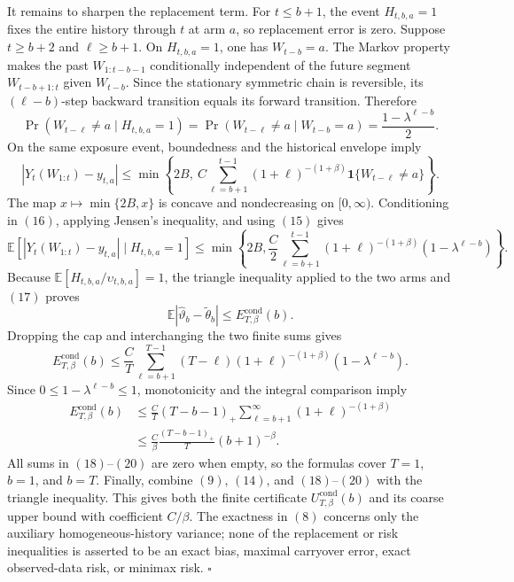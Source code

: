 It remains to sharpen the replacement term. For \(t\le b+1\), the event \(H_{t,b,a}=1\) fixes the entire history through \(t\) at arm \(a\), so replacement error is zero. Suppose \(t\ge b+2\) and \(\ell\ge b+1\). On \(H_{t,b,a}=1\), one has \(W_{t-b}=a\). The Markov property makes the past \(W_{1:t-b-1}\) conditionally independent of the future segment \(W_{t-b+1:t}\) given \(W_{t-b}\). Since the stationary symmetric chain is reversible, its \((\ell-b)\)-step backward transition equals its forward transition. Therefore
\[
\Pr(W_{t-\ell}\ne a\mid H_{t,b,a}=1)
=\Pr(W_{t-\ell}\ne a\mid W_{t-b}=a)
=\frac{1-\lambda^{\ell-b}}2.
\tag{15}
\]
On the same exposure event, boundedness and the historical envelope imply
\[
|Y_t(W_{1:t})-y_{t,a}|
\le \min\!\left\{2B,\ C\sum_{\ell=b+1}^{t-1}(1+\ell)^{-(1+\beta)}\mathbf1\{W_{t-\ell}\ne a\}\right\}.
\tag{16}
\]
The map \(x\mapsto\min\{2B,x\}\) is concave and nondecreasing on \([0,\infty)\). Conditioning in \((16)\), applying Jensen's inequality, and using \((15)\) gives
\[
\mathbb E\!\left[|Y_t(W_{1:t})-y_{t,a}|\mid H_{t,b,a}=1\right]
\le\min\!\left\{2B,\frac C2\sum_{\ell=b+1}^{t-1}(1+\ell)^{-(1+\beta)}(1-\lambda^{\ell-b})\right\}.
\tag{17}
\]
Because \(\mathbb E[H_{t,b,a}/\upsilon_{t,b,a}]=1\), the triangle inequality applied to the two arms and \((17)\) proves
\[
\mathbb E|\widehat\vartheta_b-\widetilde\theta_b|\le E_{T,\beta}^{\mathrm{cond}}(b).
\tag{18}
\]
Dropping the cap and interchanging the two finite sums gives
\[
E_{T,\beta}^{\mathrm{cond}}(b)
\le\frac CT\sum_{\ell=b+1}^{T-1}(T-\ell)(1+\ell)^{-(1+\beta)}(1-\lambda^{\ell-b}).
\tag{19}
\]
Since \(0\le1-\lambda^{\ell-b}\le1\), monotonicity and the integral comparison imply
\[
\begin{aligned}
E_{T,\beta}^{\mathrm{cond}}(b)
&\le\frac CT(T-b-1)_+\sum_{\ell=b+1}^{\infty}(1+\ell)^{-(1+\beta)}\\
&\le\frac C\beta\frac{(T-b-1)_+}{T}(b+1)^{-\beta}.
\end{aligned}
\tag{20}
\]
All sums in \((18)\)--\((20)\) are zero when empty, so the formulas cover \(T=1\), \(b=1\), and \(b=T\). Finally, combine \((9)\), \((14)\), and \((18)\)--\((20)\) with the triangle inequality. This gives both the finite certificate \(U_{T,\beta}^{\mathrm{cond}}(b)\) and its coarse upper bound with coefficient \(C/\beta\). The exactness in \((8)\) concerns only the auxiliary homogeneous-history variance; none of the replacement or risk inequalities is asserted to be an exact bias, maximal carryover error, exact observed-data risk, or minimax risk. \(\square\)
